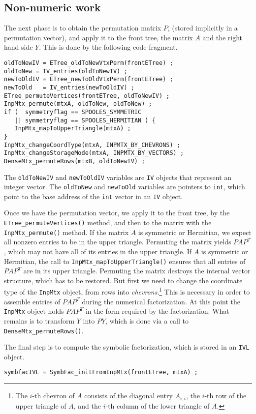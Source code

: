 \subsection{Non-numeric work}
\label{subsection:serial:non-numeric}
\par
The next phase is to obtain the permutation matrix $P$, (stored
implicitly in a permutation vector), and apply it to the front
tree, the matrix $A$ and the right hand side $Y$.
This is done by the following code fragment.
\begin{verbatim}
oldToNewIV = ETree_oldToNewVtxPerm(frontETree) ;
oldToNew = IV_entries(oldToNewIV) ;
newToOldIV = ETree_newToOldVtxPerm(frontETree) ;
newToOld   = IV_entries(newToOldIV) ;
ETree_permuteVertices(frontETree, oldToNewIV) ;
InpMtx_permute(mtxA, oldToNew, oldToNew) ;
if (  symmetryflag == SPOOLES_SYMMETRIC
   || symmetryflag == SPOOLES_HERMITIAN ) {
   InpMtx_mapToUpperTriangle(mtxA) ;
}
InpMtx_changeCoordType(mtxA, INPMTX_BY_CHEVRONS) ;
InpMtx_changeStorageMode(mtxA, INPMTX_BY_VECTORS) ;
DenseMtx_permuteRows(mtxB, oldToNewIV) ;
\end{verbatim}
The {\tt oldToNewIV} and {\tt newToOldIV} variables are {\tt IV}
objects that represent an integer vector.
The {\tt oldToNew} and {\tt newToOld} variables are pointers to
{\tt int}, which point to the base address of the {\tt int} vector
in an {\tt IV} object.
\par
Once we have the permutation vector, we apply it to the front tree,
by the {\tt ETree\_permuteVertices()} method, and then to the
matrix with the {\tt InpMtx\_permute()} method.
If the matrix $A$ is symmetric or Hermitian, we expect all nonzero
entries to be in the upper triangle.
Permuting the matrix yields $PAP^T$, which may not have all of its
entries in the upper triangle.
If $A$ is symmetric or Hermitian, the call to
{\tt InpMtx\_mapToUpperTriangle()} ensures that all entries of
$PAP^T$ are in its upper triangle.
Permuting the matrix destroys the internal vector structure, which
has to be restored.
But first we need to change the coordinate type of the {\tt InpMtx}
object, from rows into {\it chevrons}.\footnote{The $i$-th
chevron of $A$ consists of the diagonal entry $A_{i,i}$,
the $i$-th row of the upper triangle of $A$,
and the $i$-th column of the lower triangle of $A$.}
This is necessary in order to assemble entries of $PAP^T$ during
the numerical factorization.
At this point the {\tt InpMtx} object holds $PAP^T$ in the form
required by the factorization.
What remains is to transform $Y$ into $PY$, which is done via a
call to {\tt DenseMtx\_permuteRows()}.
\par
The final step is to compute the symbolic factorization,
which is stored in an {\tt IVL} object.
\begin{verbatim}
symbfacIVL = SymbFac_initFromInpMtx(frontETree, mtxA) ;
\end{verbatim}
\par
